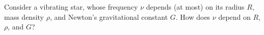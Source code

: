 Consider a vibrating star, whose frequency $\nu$ depends (at most) on its radius $R$, mass density $\rho$, and Newton's gravitational constant $G$. How does $\nu$ depend on $R$, $\rho$, and $G$?